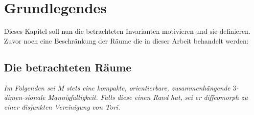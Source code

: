 \section{Grundlegendes}
\label{sec:defs}

    Dieses Kapitel soll nun die betrachteten Invarianten motivieren und sie definieren. Zuvor noch eine Beschränkung der Räume die in dieser Arbeit behandelt werden:


    \subsection{Die betrachteten Räume}
       \emph{Im Folgenden sei $M$ stets eine kompakte, orientierbare, zusammenhängende $3$-dimen-sionale Mannigfaltigkeit. Falls diese einen Rand hat, sei er diffeomorph zu einer disjunkten Vereinigung von Tori.}

